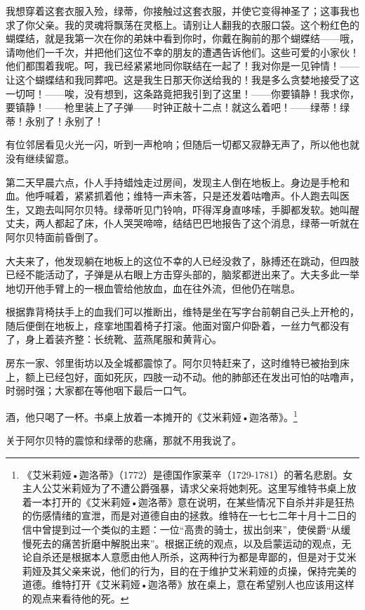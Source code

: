 \documentclass[12pt,oneside]{book}
\begin{document}
我想穿着这套衣服入殓，绿蒂，你接触过这套衣服，并使它变得神圣了；这事我也求了你父亲。我的灵魂将飘荡在灵柩上。请别让人翻我的衣服口袋。这个粉红色的蝴蝶结，就是我第一次在你的弟妹中看到你时，你戴在胸前的那个蝴蝶结——哦，请吻他们一千次，并把他们这位不幸的朋友的遭遇告诉他们。这些可爱的小家伙！他们都围着我呢。呵，我已经紧紧地同你联结在一起了！我对你是一见钟情！——让这个蝴蝶结和我同葬吧。这是我生日那天你送给我的！我是多么贪婪地接受了这一切呵！——唉，没有想到，这条路竟把我引到了这里！——你要镇静！我求你，要镇静！——枪里装上了子弹——时钟正敲十二点！就这么着吧！——绿蒂！绿蒂！永别了！永别了！

\begin{framed}
有位邻居看见火光一闪，听到一声枪响；但随后一切都又寂静无声了，所以他也就没有继续留意。

第二天早晨六点，仆人手持蜡烛走过房间，发现主人倒在地板上。身边是手枪和血。他呼喊着，紧紧抓着他；维特一声未答，只是还发着咕噜声。仆人跑去叫医生，又跑去叫阿尔贝特。绿蒂听见门铃响，吓得浑身直哆嗦，手脚都发软。她叫醒丈夫，两人都起了床，仆人哭哭啼啼，结结巴巴地报告了这个消息，绿蒂一听就在阿尔贝特面前昏倒了。

大夫来了，他发现躺在地板上的这位不幸的人已经没救了，脉搏还在跳动，但四肢已经不能活动了，子弹是从右眼上方击穿头部的，脑浆都迸出来了。大夫多此一举地切开他手臂上的一根血管给他放血，血在往外流，但他仍在喘息。

根据靠背椅扶手上的血我们可以推断出，维特是坐在写字台前朝自己头上开枪的，随后便倒在地板上，痉挛地围着椅子打滚。他面对窗户仰卧着，一丝力气都没有了，身上着装齐整：长统靴、蓝燕尾服和黄背心。

房东一家、邻里街坊以及全城都震惊了。阿尔贝特赶来了，这时维特已被抬到床上，额上已经包好，面如死灰，四肢一动不动。他的肺部还在发出可怕的咕噜声，时弱时强；大家都在等他咽下最后一口气。

酒，他只喝了一杯。书桌上放着一本摊开的《艾米莉娅•迦洛蒂》。\footnote{《艾米莉娅•迦洛蒂》（1772）是德国作家莱辛（1729-1781）的著名悲剧。女主人公艾米莉娅为了不遭公爵强暴，请求父亲将她刺死。这里写维特书桌上放着一本打开的《艾米莉娅•迦洛蒂》意在说明，在某些情况下自杀并非是狂热的伤感情绪的宣泄，而是对道德自由的拯救。维特在一七七二年十月十二日的信中曾提到过一个类似的主题：一位“高贵的骑士，拔出剑来”，使侯爵“从缓慢死去的痛苦折磨中解脱出来”。根据正统的观点，以及启蒙运动的观点，无论自杀还是根据本人意愿由他人所杀，这两种行为都是卑鄙的，但是对于艾米莉娅及其父亲来说，他们的行为，目的在于维护艾米莉娅的贞操，保持完美的道德。维特打开《艾米莉娅•迦洛蒂》放在桌上，意在希望别人也应该用这样的观点来看待他的死。}

关于阿尔贝特的震惊和绿蒂的悲痛，那就不用我说了。


\end{framed}
\end{document}
